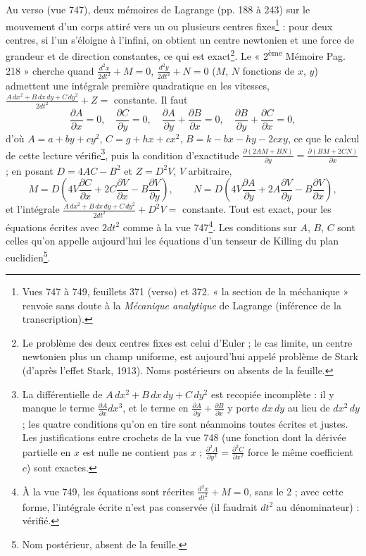 \documentclass[11pt,a4paper]{article}
\begin{document}
Au verso (vue 747), deux mémoires de Lagrange (pp. 188 à 243) sur le mouvement d'un corps attiré vers un ou plusieurs centres fixes\footnote{Vues 747 à 749, feuillets 371 (verso) et 372. « la section de la méchanique » renvoie sans doute à la \emph{Mécanique analytique} de Lagrange (inférence de la transcription).} : pour deux centres, si l'un s'éloigne à l'infini, on obtient un centre newtonien et une force de grandeur et de direction constantes, ce qui est exact\footnote{Le problème des deux centres fixes est celui d'Euler ; le cas limite, un centre newtonien plus un champ uniforme, est aujourd'hui appelé problème de Stark (d'après l'effet Stark, 1913). Noms postérieurs ou absents de la feuille.}. Le « 2\textsuperscript{ème} Mémoire Pag. 218 » cherche quand $\frac{d^2x}{2dt^2}+M=0$, $\frac{d^2y}{2dt^2}+N=0$ ($M$, $N$ fonctions de $x$, $y$) admettent une intégrale première quadratique en les vitesses, $\frac{A\,dx^2+B\,dx\,dy+C\,dy^2}{2dt^2}+Z=$ constante. Il faut
\[ \frac{\partial A}{\partial x}=0,\quad \frac{\partial C}{\partial y}=0,\quad \frac{\partial A}{\partial y}+\frac{\partial B}{\partial x}=0,\quad \frac{\partial B}{\partial y}+\frac{\partial C}{\partial x}=0, \]
d'où $A=a+by+cy^2$, $C=g+hx+cx^2$, $B=k-bx-hy-2cxy$, ce que le calcul de cette lecture vérifie\footnote{La différentielle de $A\,dx^2+B\,dx\,dy+C\,dy^2$ est recopiée incomplète : il y manque le terme $\frac{\partial A}{\partial x}dx^3$, et le terme en $\frac{\partial A}{\partial y}+\frac{\partial B}{\partial x}$ y porte $dx\,dy$ au lieu de $dx^2\,dy$ ; les quatre conditions qu'on en tire sont néanmoins toutes écrites et justes. Les justifications entre crochets de la vue 748 (une fonction dont la dérivée partielle en $x$ est nulle ne contient pas $x$ ; $\frac{\partial^2A}{\partial y^2}=\frac{\partial^2C}{\partial x^2}$ force le même coefficient $c$) sont exactes.}, puis la condition d'exactitude $\frac{\partial(2AM+BN)}{\partial y}=\frac{\partial(BM+2CN)}{\partial x}$ ; en posant $D=4AC-B^2$ et $Z=D^2V$, $V$ arbitraire,
\[ M=D\left(4V\frac{\partial C}{\partial x}+2C\frac{\partial V}{\partial x}-B\frac{\partial V}{\partial y}\right),\qquad N=D\left(4V\frac{\partial A}{\partial y}+2A\frac{\partial V}{\partial y}-B\frac{\partial V}{\partial x}\right), \]
et l'intégrale $\frac{A\,dx^2+B\,dx\,dy+C\,dy^2}{2dt^2}+D^2V=$ constante. Tout est exact, pour les équations écrites avec $2dt^2$ comme à la vue 747\footnote{À la vue 749, les équations sont récrites $\frac{d^2x}{dt^2}+M=0$, sans le 2 ; avec cette forme, l'intégrale écrite n'est pas conservée (il faudrait $dt^2$ au dénominateur) : vérifié.}. Les conditions sur $A$, $B$, $C$ sont celles qu'on appelle aujourd'hui les équations d'un tenseur de Killing du plan euclidien\footnote{Nom postérieur, absent de la feuille.}.
\end{document}
